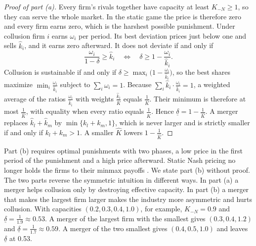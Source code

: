 \begin{proof}[Proof of part (a)]
Every firm's rivals together have capacity at least $K_{-N} \ge 1$, so they can serve the whole market. In the
static game the price is therefore zero and every firm earns zero, which is the harshest possible punishment. Under
collusion firm $i$ earns $\omega_i$ per period. Its best deviation prices just below one and sells $\hat k_i$, and it
earns zero afterward. It does not deviate if and only if
\begin{equation*}
\frac{\omega_i}{1 - \delta} \ge \hat k_i
\quad\Longleftrightarrow\quad
\delta \ge 1 - \frac{\omega_i}{\hat k_i} .
\end{equation*}
Collusion is sustainable if and only if $\delta \ge \max_i\big(1 - \frac{\omega_i}{\hat k_i}\big)$, so the best
shares maximize $\min_i\frac{\omega_i}{\hat k_i}$ subject to $\sum_i\omega_i = 1$. Because $\sum_i\hat
k_i\cdot\frac{\omega_i}{\hat k_i} = 1$, a weighted average of the ratios $\frac{\omega_i}{\hat k_i}$ with weights
$\frac{\hat k_i}{\hat K}$ equals $\frac{1}{\hat K}$. Their minimum is therefore at most $\frac{1}{\hat K}$, with
equality when every ratio equals $\frac{1}{\hat K}$. Hence $\underline\delta = 1 - \frac{1}{\hat K}$. A merger
replaces $\hat k_l + \hat k_m$ by $\min\{k_l + k_m, 1\}$, which is never larger and is strictly smaller if and only if
$k_l + k_m > 1$. A smaller $\hat K$ lowers $1 - \frac{1}{\hat K}$.
\end{proof}

Part (b) requires optimal punishments with two phases, a low price in the first period of the punishment and a high
price afterward. Static Nash pricing no longer holds the firms to their minmax payoffs
\citep[p.~240, n.~156]{AskerNocke2021}. We state part (b) without proof. The two parts reverse the symmetric intuition in
different ways. In part (a) a merger helps collusion only by destroying effective capacity. In part (b) a merger
that makes the largest firm larger makes the industry more asymmetric and hurts collusion. With capacities $(0.2,
0.3, 0.4, 1.0)$, for example, $K_{-N} = 0.9$ and $\underline\delta = \frac{1}{1.9} \approx 0.53$. A merger of the
largest firm with the smallest gives $(0.3, 0.4, 1.2)$ and $\underline\delta = \frac{1}{1.7} \approx 0.59$. A merger
of the two smallest gives $(0.4, 0.5, 1.0)$ and leaves $\underline\delta$ at 0.53.

